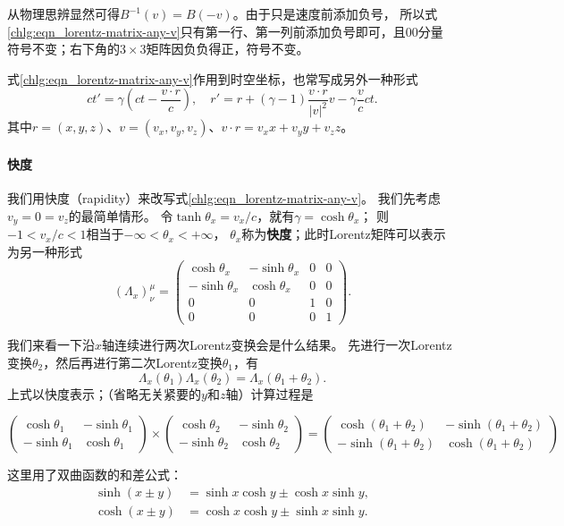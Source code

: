 从物理思辨显然可得$B^{-1}(v)=B(-v)$。由于只是速度前添加负号，
所以式\eqref{chlg:eqn_lorentz-matrix-any-v}只有第一行、第一列前添加负号即可，且$00$分量
符号不变；右下角的$3\times 3$矩阵因负负得正，符号不变。

式\eqref{chlg:eqn_lorentz-matrix-any-v}作用到时空坐标，也常写成另外一种形式
\begin{equation}
    ct'= \gamma\left( ct-\frac{v\cdot r}{c}\right) , \quad
    r' = r+(\gamma-1)\frac{v
        \cdot r}{|v|^2}v-\gamma \frac{v}{c} ct.
\end{equation}
其中$r=(x,y,z)$、$v=(v_x, v_y, v_z )$、$v\cdot r=v_x x+v_y y+v_z z$。

\paragraph{快度}\label{chlg:sec_rapid}
我们用{快度}（rapidity）来改写式\eqref{chlg:eqn_lorentz-matrix-any-v}。
我们先考虑$v_y=0=v_z$的最简单情形。
令$\tanh \theta_x=v_x/c$，就有$\gamma = \cosh \theta_x$；
则$-1<v_x/c<1$相当于$-\infty < \theta_x <+\infty$，
$\theta_x$称为\textbf{快度}；此时Lorentz矩阵可以表示为另一种形式
\begin{equation}\label{chlg:eqn_lorentz-rapid-x}
    (\Lambda_x)^{\mu}_{\nu} =
    \begin{pmatrix}
        \cosh\theta_x  & -\sinh\theta_x & 0 & 0 \\
        -\sinh\theta_x & \cosh\theta_x  & 0 & 0 \\
        0 & 0 & 1 & 0 \\
        0 & 0 & 0 & 1
    \end{pmatrix}.
\end{equation}

我们来看一下沿$x$轴连续进行两次Lorentz变换会是什么结果。
先进行一次Lorentz变换$\theta_2$，然后再进行第二次Lorentz变换$\theta_1$，有
\begin{equation}\label{chlg:eqn_b1b2}
    \Lambda_x(\theta_1) \Lambda_x(\theta_2) = \Lambda_x(\theta_1+\theta_2).
\end{equation}
上式以快度表示；（省略无关紧要的$y$和$z$轴）计算过程是
\begin{small}
\[\begin{pmatrix}
    \cosh\theta_1  & -\sinh\theta_1 \\
    -\sinh\theta_1 & \cosh\theta_1
\end{pmatrix} \times
\begin{pmatrix}
    \cosh\theta_2  & -\sinh\theta_2  \\
    -\sinh\theta_2 & \cosh\theta_2
\end{pmatrix} =
\begin{pmatrix}
    \cosh(\theta_1+\theta_2)  & -\sinh(\theta_1+\theta_2)  \\
    -\sinh(\theta_1+\theta_2) & \cosh(\theta_1+\theta_2)
\end{pmatrix} \]
\end{small}
这里用了双曲函数的和差公式：
\[
\begin{aligned}
    \sinh(x\pm y)&=\sinh x\cosh y\pm\cosh x\sinh y,\\
    \cosh(x\pm y)&=\cosh x\cosh y\pm\sinh x\sinh y.
\end{aligned}
\]

